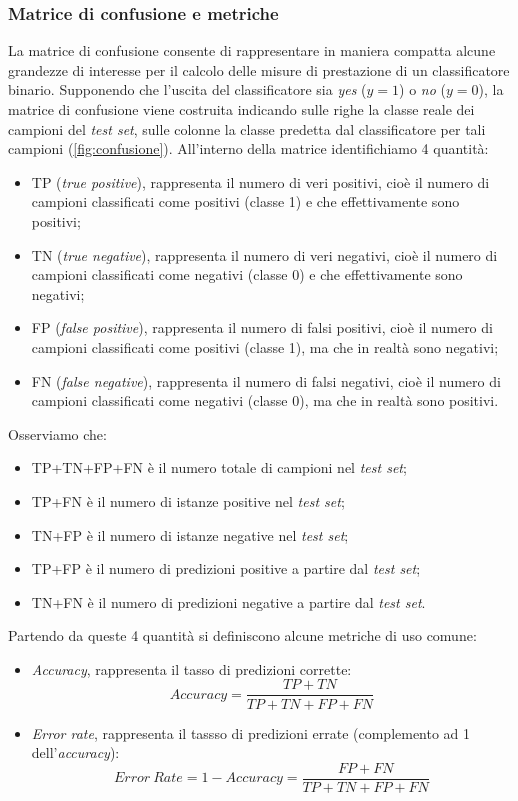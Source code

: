 \subsubsection{Matrice di confusione e metriche}
La matrice di confusione consente di rappresentare in maniera compatta alcune grandezze di interesse per il calcolo delle misure di prestazione di un classificatore binario. Supponendo che l'uscita del classificatore sia \emph{yes} ($y=1$) o \emph{no} ($y=0$), la matrice di confusione viene costruita indicando sulle righe la classe reale dei campioni del \emph{test set}, sulle colonne la classe predetta dal classificatore per tali campioni (\autoref{fig:confusione}). All'interno della matrice identifichiamo 4 quantità:
\begin{itemize}
\item TP (\emph{true positive}), rappresenta il numero di veri positivi, cioè il numero di campioni classificati come positivi (classe 1) e che effettivamente sono positivi;
\item TN (\emph{true negative}), rappresenta il numero di veri negativi, cioè il numero di campioni classificati come negativi (classe 0) e che effettivamente sono negativi;
\item FP (\emph{false positive}), rappresenta il numero di falsi positivi, cioè il numero di campioni classificati come positivi (classe 1), ma che in realtà sono negativi;
\item FN (\emph{false negative}), rappresenta il numero di falsi negativi, cioè il numero di campioni classificati come negativi (classe 0), ma che in realtà sono positivi.
\end{itemize}
Osserviamo che:
\begin{itemize}
\item TP+TN+FP+FN è il  numero totale di campioni nel \emph{test set};
\item TP+FN è il numero di istanze positive nel \emph{test set};
\item TN+FP è il numero di istanze negative nel \emph{test set};
\item TP+FP è il numero di predizioni positive a partire dal \emph{test set};
\item TN+FN è il numero di predizioni negative a partire dal \emph{test set}.
\end{itemize}
Partendo da queste 4 quantità si definiscono alcune metriche di uso comune:
\begin{itemize}
\item \emph{Accuracy}, rappresenta il tasso di predizioni corrette:
\begin{equation*}
Accuracy = \frac{TP + TN}{TP+TN+FP+FN}
\end{equation*}
\item \emph{Error rate}, rappresenta il tassso di predizioni errate (complemento ad 1 dell'\emph{accuracy}):
\begin{equation*}
Error~Rate = 1 - Accuracy = \frac{FP + FN}{TP+TN+FP+FN}
\end{equation*}
\end{itemize}

